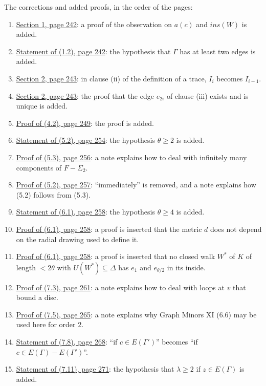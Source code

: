 The corrections and added proofs, in the order of the pages:
\begin{enumerate}\setlength{\itemsep}{1pt}
\item {}\hyperref[fix:1-observation-proof-added]{Section 1, page 242}: a proof of the observation on $a(c)$ and $ins(W)$ is added.
\item {}\hyperref[fix:1.2]{Statement of (1.2), page 242}: the hypothesis that $\Gamma$ has at least two
edges is added.
\item {}\hyperref[fix:2-trace]{Section 2, page 243}: in clause (ii) of the definition of a trace,
$I_i$ becomes $I_{i-1}$.
\item {}\hyperref[fix:2-enters-proof-added]{Section 2, page 243}: the proof that the edge $e_{2i}$ of clause (iii) exists and is unique is added.
\item {}\hyperref[fix:4.2-proof-added]{Proof of (4.2), page 249}: the proof is added.
\item {}\hyperref[fix:5.2]{Statement of (5.2), page 254}: the hypothesis $\theta \ge 2$ is added.
\item {}\hyperref[fix:5.3-proof]{Proof of (5.3), page 256}: a note explains how to deal with
infinitely many components of $F - \Sigma_2$.
\item {}\hyperref[fix:5.2-proof]{Proof of (5.2), page 257}: ``immediately'' is removed, and a note
explains how (5.2) follows from (5.3).
\item {}\hyperref[fix:6.1]{Statement of (6.1), page 258}: the hypothesis $\theta \ge 4$ is added.
\item {}\hyperref[fix:6.1-proof-metric]{Proof of (6.1), page 258}: a proof is inserted that the
metric $d$ does not depend on the radial drawing used to define it.
\item {}\hyperref[fix:6.1-proof-walk]{Proof of (6.1), page 258}: a proof is inserted that no
closed walk $W^*$ of $K$ of length $< 2\theta$ with $U(W^*) \subseteq \Delta$ has $e_1$ and
$e_{\theta/2}$ in its inside.
\item {}\hyperref[fix:7.3-proof]{Proof of (7.3), page 261}: a note explains how to deal with loops
at $v$ that bound a disc.
\item {}\hyperref[fix:7.5-proof]{Proof of (7.5), page 265}: a note explains why Graph Minors XI
(6.6) may be used here for order 2.
\item {}\hyperref[fix:7.8]{Statement of (7.8), page 268}: ``if $c \in E(\Gamma')$'' becomes ``if
$c \in E(\Gamma) - E(\Gamma')$''.
\item {}\hyperref[fix:7.11]{Statement of (7.11), page 271}: the hypothesis that $\lambda \ge 2$ if
$z \in E(\Gamma)$ is added.
\end{enumerate}
